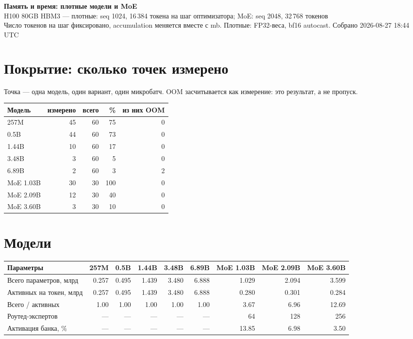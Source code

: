 \documentclass[10pt]{article}
\begin{document}
\begin{center}
{\LARGE\bfseries Память и время: плотные модели и MoE}\\[4pt]
{\large H100 80GB HBM3 --- плотные: seq 1024, 16\,384 токена на шаг оптимизатора;
MoE: seq 2048, 32\,768 токенов}\\[2pt]
{\normalsize Число токенов на шаг фиксировано, accumulation меняется вместе с mb.
Плотные: FP32-веса, bf16 autocast. Собрано 2026-08-27 18:44 UTC}
\end{center}
\vspace{6pt}
\section{Покрытие: сколько точек измерено}
Точка --- одна модель, один вариант, один микробатч. OOM засчитывается как измерение: это результат, а не пропуск.
\begin{center}
\small
\begin{tabular}{lrrrr}
\toprule
\textbf{Модель} & \textbf{измерено} & \textbf{всего} & \textbf{\%} & \textbf{из них OOM} \\
\midrule
257M & 45 & 60 & 75 & 0 \\
0.5B & 44 & 60 & 73 & 0 \\
1.44B & 10 & 60 & 17 & 0 \\
3.48B & 3 & 60 & 5 & 0 \\
6.89B & 2 & 60 & 3 & 2 \\
MoE 1.03B & 30 & 30 & 100 & 0 \\
MoE 2.09B & 12 & 30 & 40 & 0 \\
MoE 3.60B & 3 & 30 & 10 & 0 \\
\bottomrule
\end{tabular}
\end{center}
\section{Модели}
\begin{center}
\small
\begin{tabular}{lrrrrrrrr}
\toprule
\textbf{Параметры} & \textbf{257M} & \textbf{0.5B} & \textbf{1.44B} & \textbf{3.48B} & \textbf{6.89B} & \textbf{MoE 1.03B} & \textbf{MoE 2.09B} & \textbf{MoE 3.60B} \\
\midrule
Всего параметров, млрд & 0.257 & 0.495 & 1.439 & 3.480 & 6.888 & 1.029 & 2.094 & 3.599 \\
Активных на токен, млрд & 0.257 & 0.495 & 1.439 & 3.480 & 6.888 & 0.280 & 0.301 & 0.284 \\
Всего / активных & 1.00 & 1.00 & 1.00 & 1.00 & 1.00 & 3.67 & 6.96 & 12.69 \\
Роутед-экспертов & --- & --- & --- & --- & --- & 64 & 128 & 256 \\
Активация банка, \% & --- & --- & --- & --- & --- & 13.85 & 6.98 & 3.50 \\
\bottomrule
\end{tabular}
\end{center}
\end{document}
